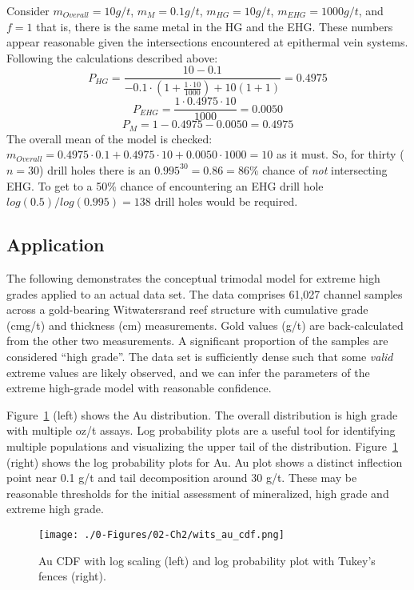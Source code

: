 Consider $m_{Overall} = 10 g/t$, $m_{M} = 0.1 g/t$, $m_{HG} = 10 g/t$, $m_{EHG} = 1000 g/t$, and $f=1$ that is, there is the same metal in the HG and the \gls{EHG}. These numbers appear reasonable given the intersections encountered at epithermal vein systems. Following the calculations described above:
\[
    P_{HG} =
    \frac{10 - 0.1}
    {
        -0.1 \cdot \left( 1+\frac{1 \cdot 10}{1000}\right) + 10(1+1)
    }
    = 0.4975
\]
\[
    P_{EHG} = \frac{1 \cdot 0.4975 \cdot 10}{1000} = 0.0050
\]
\[
    P_{M} = 1 - 0.4975 - 0.0050 = 0.4975
\]
The overall mean of the model is checked: $m_{Overall} = 0.4975 \cdot 0.1 + 0.4975 \cdot 10 + 0.0050 \cdot 1000 = 10$ as it must. So, for thirty ($n=30$) drill holes there is an $0.995^{30}=0.86=86\%$ chance of {\em not} intersecting \gls{EHG}. To get to a 50\% chance of encountering an \gls{EHG} drill hole $log(0.5)/log(0.995)=138$ drill holes would be required.

\subsection{Application}
\label{subsec:02applicationehg}

The following demonstrates the conceptual trimodal model for extreme high grades applied to an actual data set. The data comprises 61,027 channel samples across a gold-bearing Witwatersrand reef structure with cumulative grade (cmg/t) and thickness (cm) measurements. Gold values (g/t) are back-calculated from the other two measurements. A significant proportion of the samples are considered ``high grade''. The data set is sufficiently dense such that some \emph{valid} extreme values are likely observed, and we can infer the parameters of the extreme high-grade model with reasonable confidence.

Figure~\ref{fig:wits_au_cdf} (left) shows the Au distribution. The overall distribution is high grade with multiple oz/t assays. Log probability plots are a useful tool for identifying multiple populations and visualizing the upper tail of the distribution. Figure~\ref{fig:wits_au_cdf} (right) shows the log probability plots for Au. Au plot shows a distinct inflection point near 0.1 g/t and tail decomposition around 30 g/t. These may be reasonable thresholds for the initial assessment of mineralized, high grade and extreme high grade.

\begin{figure}[htb!]
    \centering
    \texttt{[image: ./0-Figures/02-Ch2/wits\_au\_cdf.png]}
    \caption{Au \gls{CDF} with log scaling (left) and log probability plot with Tukey's fences \citep{tukey1977exploratory} (right).}
    \label{fig:wits_au_cdf}
\end{figure}

